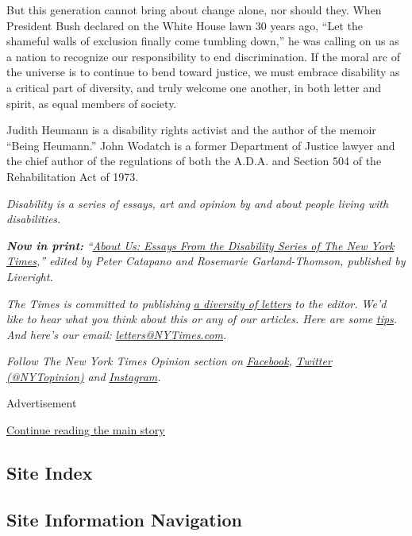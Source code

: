 But this generation cannot bring about change alone, nor should they.
When President Bush declared on the White House lawn 30 years ago, ``Let
the shameful walls of exclusion finally come tumbling down,'' he was
calling on us as a nation to recognize our responsibility to end
discrimination. If the moral arc of the universe is to continue to bend
toward justice, we must embrace disability as a critical part of
diversity, and truly welcome one another, in both letter and spirit, as
equal members of society.

Judith Heumann is a disability rights activist and the author of the
memoir ``Being Heumann.'' John Wodatch is a former Department of Justice
lawyer and the chief author of the regulations of both the A.D.A. and
Section 504 of the Rehabilitation Act of 1973.

\emph{Disability is a series of essays, art and opinion by and about
people living with disabilities.}

\emph{\textbf{Now in print:}}
\emph{``}\href{https://www.aboutusbook.com/}{\emph{About Us: Essays From
the Disability Series of The New York Times}}\emph{,'' edited by Peter
Catapano and Rosemarie Garland-Thomson, published by Liveright.}

\emph{The Times is committed to publishing}
\href{https://www.nytimes3xbfgragh.onion/2019/01/31/opinion/letters/letters-to-editor-new-york-times-women.html}{\emph{a
diversity of letters}} \emph{to the editor. We'd like to hear what you
think about this or any of our articles. Here are some}
\href{https://help.nytimes3xbfgragh.onion/hc/en-us/articles/115014925288-How-to-submit-a-letter-to-the-editor}{\emph{tips}}\emph{.
And here's our email:}
\href{mailto:letters@NYTimes.com}{\emph{letters@NYTimes.com}}\emph{.}

\emph{Follow The New York Times Opinion section on}
\href{https://www.facebookcorewwwi.onion/nytopinion}{\emph{Facebook}}\emph{,}
\href{http://twitter.com/NYTOpinion}{\emph{Twitter (@NYTopinion)}}
\emph{and}
\href{https://www.instagram.com/nytopinion/}{\emph{Instagram}}\emph{.}

Advertisement

\protect\hyperlink{after-bottom}{Continue reading the main story}

\hypertarget{site-index}{%
\subsection{Site Index}\label{site-index}}

\hypertarget{site-information-navigation}{%
\subsection{Site Information
Navigation}\label{site-information-navigation}}

